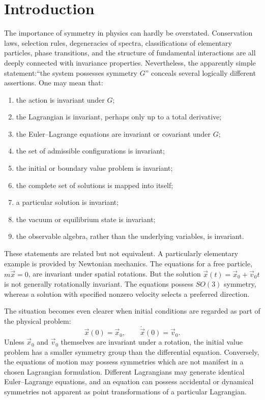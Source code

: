 \section{ Introduction}
The importance of symmetry in physics can hardly be overstated.  Conservation laws, selection rules, degeneracies of spectra, classifications of elementary particles, phase transitions, and the structure of fundamental interactions are all deeply connected with invariance properties.
Nevertheless, the apparently simple statement:``the system possesses symmetry $G$''
conceals several logically different assertions.
One may mean that:
\begin{enumerate}
\item the action is invariant under $G$;
\item the Lagrangian is invariant, perhaps only up to a total derivative;
\item the Euler--Lagrange equations are invariant or covariant under $G$;
\item the set of admissible configurations is invariant;
\item the initial or boundary value problem is invariant;
\item the complete set of solutions is mapped into itself;
\item a particular solution is invariant;
\item the vacuum or equilibrium state is invariant;
\item the observable algebra, rather than the underlying variables, is invariant.
\end{enumerate}
These statements are related but not equivalent.
A particularly elementary example is provided by Newtonian mechanics.  The
equations for a free particle,$m \ddot{\vec x}=0$,
are invariant under spatial rotations.  But the solution
$\vec{x}(t)=\vec{x}_0+\vec{v}_0 t$ 
is not generally rotationally invariant.  The equations possess $SO(3)$
symmetry, whereas a solution with specified nonzero velocity selects a
preferred direction.

The situation becomes even clearer when initial conditions are regarded as part
of the physical problem:
\[\vec{x}(0)=\vec{x}_0,\qquad \dot{\vec{x}}(0)=\vec{v}_0.\]
Unless $\vec{x}_0$ and $\vec{v}_0$ themselves are invariant under a rotation,
the initial value problem has a smaller symmetry group than the differential
equation.
Conversely, the equations of motion may possess symmetries which are not
manifest in a chosen Lagrangian formulation.  Different Lagrangians may
generate identical Euler--Lagrange equations, and an equation can possess
accidental or dynamical symmetries not apparent as point transformations of a
particular Lagrangian.


